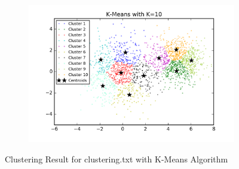 \begin{description}
\begin{description}
\begin{figure}[!h]
\begin{subfigure}[b]{0.475\textwidth}
        \end{subfigure}
        \hfill
        \begin{subfigure}[b]{0.475\textwidth}   
            \centering 
            \includegraphics[width=\textwidth]{./figures/clustering_kMeans_10.png}
        \end{subfigure}
        
        \caption{Clustering Result for clustering.txt with K-Means Algorithm}
        \label{fig:kmean_clustering}
\end{figure}


\end{description}
\end{description}
